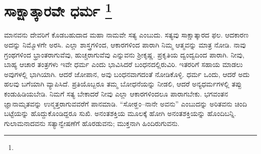 
\chapter[ಸಾಕ್ಷಾತ್ಕಾರವೇ ಧರ್ಮ ]{ಸಾಕ್ಷಾತ್ಕಾರವೇ ಧರ್ಮ \protect\footnote{}}

ಮಾನವನು ದೇವರಿಗೆ ಕೊಡಬಹುದಾದ ಮಹಾ ನಾಮವೇ ಸತ್ಯ ಎಂಬುದು. ಸತ್ಯವು ಸಾಕ್ಷಾತ್ಕಾರದ ಫಲ. ಆದಕಾರಣ ಅದನ್ನು ನಿಮ್ಮೊಳಗೇ ಅರಸಿ. ಎಲ್ಲಾ ಶಾಸ್ತ್ರಗಳಿಂದ, ಆಕಾರಗಳಿಂದ ಪಾರಾಗಿ ನಿಮ್ಮ ಆತ್ಮವನ್ನು ಮಾತ್ರ ನೋಡಿ. ನಾವು ಗ್ರಂಥಗಳಿಂದ ಭ್ರಾಂತರಾಗುವೆವು, ಹುಚ್ಚರಾಗುವೆವು ಎನ್ನುವನು ಶ‍್ರೀಕೃಷ್ಣ. ಪ್ರಕೃತಿಯ ದ್ವಂದ್ವದಿಂದ ಪಾರಾಗಿ. ನೀವು, ಬಾಹ್ಯ ಆಚಾರ ತಂತ್ರಗಳು ಇವೇ ಧರ್ಮ ಎಂದು ಭಾವಿಸಿದರೆ ಬಂಧನದಲ್ಲಿರುವಿರಿ. ಇತರರಿಗೆ ಸಹಾಯ ಮಾಡಲು ಅವುಗಳಲ್ಲಿ ಭಾಗಿಯಾಗಿ. ಆದರೆ ಜೋಪಾನ, ಅವು ಬಂಧನವಾಗದಂತೆ ನೋಡಿಕೊಳ್ಳಿ. ಧರ್ಮ ಒಂದು, ಆದರೆ ಅದು ಹಲವು ಬಗೆಯಾಗಿ ವ್ಯಾಪಿಸಿದೆ. ಪ್ರತಿಯೊಬ್ಬರೂ ತಮ್ಮ ಬೋಧನೆಯನ್ನು ನೀಡಲಿ, ಆದರೆ ಅನ್ಯಧರ್ಮಗಳಲ್ಲಿ ತಪ್ಪು ಕಂಡುಹಿಡಿಯಬೇಡಿ. ನಿಮಗೆ ಸತ್ಯ ಬೇಕಾದರೆ ನೀವು ಎಲ್ಲಾ ಆಕಾರಗಳಿಂದಲೂ ಪಾರಾಗಬೇಕು. ಭಗವಂತನ ಜ್ಞಾನಾಮೃತವನ್ನು ಉನ್ಮತ್ತರಾಗುವವರೆಗೆ ಪಾನಮಾಡಿ. “ಸೋಠ್ಹಂ–ನಾನೇ ಅವನು” ಎಂಬುದನ್ನು ಅರಿತವನು ಚಿಂದಿ ಬಟ್ಟೆಯನ್ನು ಹೊದ್ದುಕೊಂಡಿದ್ದರೂ ಸುಖಿ. ಅನಂತಶಕ್ತಿಯ ಮೂಲಕ್ಕೆ ಹೋಗಿ ಅನಂತಶಕ್ತಿಯನ್ನು ಹೊಂದಿಬನ್ನಿ. ಗುಲಾಮನಾದವನು ಸತ್ಯಾನ್ವೇಷಣೆಗೆ ಹೊರಡುವನು; ಮುಕ್ತನಾಗಿ ಹಿಂದಿರುಗುವನು.

